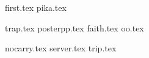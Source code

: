 \documentclass[11pt,a4paper,oneside,korean]{article}
\begin{document}
    {first.tex}    
    \setcounter{page}{1}
    {pika.tex}
    \setcounter{page}{1}
    
    {trap.tex}
    \setcounter{page}{1}
    {posterpp.tex}
    \setcounter{page}{1}
    {faith.tex}
    \setcounter{page}{1}
    {oo.tex}
    \setcounter{page}{1}
    
    {nocarry.tex}
    \setcounter{page}{1}
    {server.tex}
    \setcounter{page}{1}
    {trip.tex}
    
\end{document}
